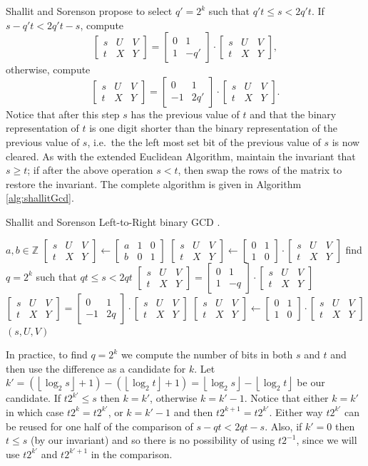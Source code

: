 \documentclass{ucalgthes1}
\theoremstyle{definition}
\newcommand{\ZZ}{\mathbb{Z}}
\newcommand{\matrixtt}[4]{\left[ \begin{array}{rr} #1 & #2 \\ #3 & #4 \end{array} \right]}
\newcommand{\matrixThreeTwo}[6]{\left[ \begin{array}{rrr} #1 & #2 & #3 \\ #4 & #5 & #6 \end{array} \right]}
\newcommand{\floor}[1]{\left\lfloor #1 \right\rfloor}
\begin{document}
Shallit and Sorenson \cite{Shallit1994} propose to select $q'=2^k$ such that $q't \le s < 2q't$.  If $s - q't < 2q't - s$, compute
\[
	\matrixThreeTwo{s}{U}{V}{t}{X}{Y} =
		\matrixtt{0}{1}{1}{-q'} \cdot \matrixThreeTwo{s}{U}{V}{t}{X}{Y},
\]
otherwise, compute
\[
	\matrixThreeTwo{s}{U}{V}{t}{X}{Y} =
		\matrixtt{0}{1}{-1}{2q'} \cdot \matrixThreeTwo{s}{U}{V}{t}{X}{Y}.
\]
Notice that after this step $s$ has the previous value of $t$ and that the binary representation of $t$ is one digit shorter than the binary representation of the previous value of $s$, i.e.\ the the left most set bit of the previous value of $s$ is now cleared.  As with the extended Euclidean Algorithm, maintain the invariant that $s \ge t$; if after the above operation $s < t$, then swap the rows of the matrix to restore the invariant. The complete algorithm is given in Algorithm \ref{alg:shallitGcd}.

\begin{algorithm}[h]
\caption{Shallit and Sorenson Left-to-Right binary GCD \cite{Shallit1994}.}
\label{alg:shallitGcd}
\begin{algorithmic}[1]
\REQUIRE $a,b \in \ZZ$
\STATE $\matrixThreeTwo{s}{U}{V}{t}{X}{Y} \gets 
        \matrixThreeTwo{a}{1}{0}{b}{0}{1}$
	\STATE $\matrixThreeTwo{s}{U}{V}{t}{X}{Y} \gets
	        \matrixtt{0}{1}{1}{0} \cdot \matrixThreeTwo{s}{U}{V}{t}{X}{Y}$
\ENDIF
{}
	\STATE find $q=2^k$ such that $qt \le s < 2qt$
		\STATE $\matrixThreeTwo{s}{U}{V}{t}{X}{Y} =
		\matrixtt{0}{1}{1}{-q} \cdot \matrixThreeTwo{s}{U}{V}{t}{X}{Y}$
	\ELSE
		\STATE $\matrixThreeTwo{s}{U}{V}{t}{X}{Y} =
		\matrixtt{0}{1}{-1}{2q} \cdot \matrixThreeTwo{s}{U}{V}{t}{X}{Y}$
	\ENDIF
		\STATE $\matrixThreeTwo{s}{U}{V}{t}{X}{Y} \gets
	    	    \matrixtt{0}{1}{1}{0} \cdot \matrixThreeTwo{s}{U}{V}{t}{X}{Y}$
	\ENDIF
\ENDWHILE
\RETURN $(s, U, V)$
\end{algorithmic}
\end{algorithm}
In practice, to find $q=2^k$ we compute the number of bits in both $s$ and $t$ and then use the difference as a candidate for $k$.  Let $k' = (\floor{\log_2s} + 1) - (\floor{\log_2t}+1) = \floor{\log_2s} - \floor{\log_2t}$ be our candidate.  If $t2^{k'} \le s$ then $k = k'$, otherwise $k = k'-1$.  Notice that either $k=k'$ in which case $t2^k=t2^{k'}$, or $k=k'-1$ and then $t2^{k+1} = t2^{k'}$.  Either way $t2^{k'}$ can be reused for one half of the comparison of $s-qt < 2qt - s$.  Also, if $k' = 0$ then $t \le s$ (by our invariant) and so there is no possibility of using $t2^{-1}$, since we will use $t2^{k'}$ and $t2^{k'+1}$ in the comparison.
\end{document}
